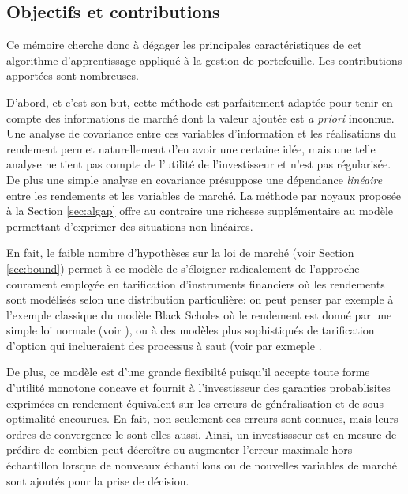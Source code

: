 




\subsection{Objectifs et contributions}

Ce mémoire cherche donc à dégager les principales caractéristiques de cet algorithme
d'apprentissage appliqué à la gestion de portefeuille. Les contributions apportées sont
nombreuses.

D'abord, et c'est son but, cette méthode est parfaitement adaptée pour tenir en compte des
informations de marché dont la valeur ajoutée est \textit{a priori} inconnue. Une analyse
de covariance entre ces variables d'information et les réalisations du rendement permet
naturellement d'en avoir une certaine idée, mais une telle analyse ne tient pas compte de
l'utilité de l'investisseur et n'est pas régularisée. De plus une simple analyse en
covariance présuppose une dépendance \textit{linéaire} entre les rendements et les
variables de marché. La méthode par noyaux proposée à la Section \ref{sec:algap} offre au
contraire une richesse supplémentaire au modèle permettant d'exprimer des situations non
linéaires.

En fait, le faible nombre d'hypothèses sur la loi de marché (voir Section \ref{sec:bound})
permet à ce modèle de s'éloigner radicalement de l'approche courament employée en
tarification d'instruments financiers où les rendements sont modélisés selon une
distribution particulière: on peut penser par exemple à l'exemple classique du modèle
Black Scholes où le rendement est donné par une simple loi normale (voir
\cite{shreve2004stochastic}), ou à des modèles plus sophistiqués de tarification d'option
qui inclueraient des processus à saut (voir par exmeple \cite{madan1998variance}.

De plus, ce modèle est d'une grande flexibilté puisqu'il accepte toute forme d'utilité
monotone concave et fournit à l'investisseur des garanties probablisites exprimées en
rendement équivalent sur les erreurs de généralisation et de sous optimalité encourues. En
fait, non seulement ces erreurs sont connues, mais leurs ordres de convergence le sont
elles aussi. Ainsi, un investissseur est en mesure de prédire de combien peut décroître ou
augmenter l'erreur maximale hors échantillon lorsque de nouveaux échantillons ou de
nouvelles variables de marché sont ajoutés pour la prise de décision.

